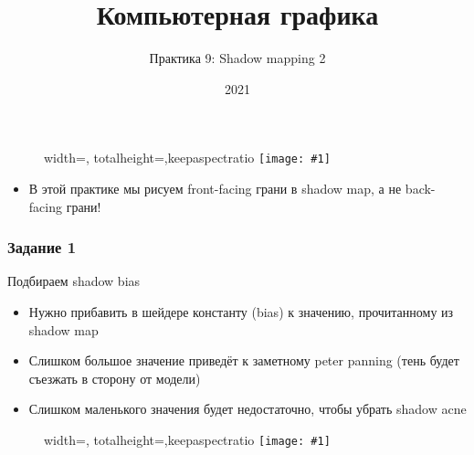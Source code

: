 \documentclass{beamer}
\title{Компьютерная графика}
\subtitle{Практика 9: Shadow mapping 2}
\date{2021}
\newcommand{\slideimage}[1]{
  \begin{figure}
    \begin{adjustbox}{width=\textwidth, totalheight=\textheight-2\baselineskip-2\baselineskip,keepaspectratio}
      \texttt{[image: \#1]}
    \end{adjustbox}
  \end{figure}
}
\begin{document}
\frame{\titlepage}

\begin{frame}[fragile]
\slideimage{0.png}
\end{frame}

\begin{frame}[fragile]
\begin{itemize}
\item В этой практике мы рисуем front-facing грани в shadow map, а не back-facing грани!
\end{itemize}
\end{frame}

\begin{frame}[fragile]
\frametitle{Задание 1}
Подбираем shadow bias
\begin{itemize}
\item Нужно прибавить в шейдере константу (bias) к значению, прочитанному из shadow map
\item Слишком большое значение приведёт к заметному peter panning (тень будет съезжать в сторону от модели)
\item Слишком маленького значения будет недостаточно, чтобы убрать shadow acne
\end{itemize}
\end{frame}

\begin{frame}[fragile]
\slideimage{1.png}
\end{frame}
\end{document}
